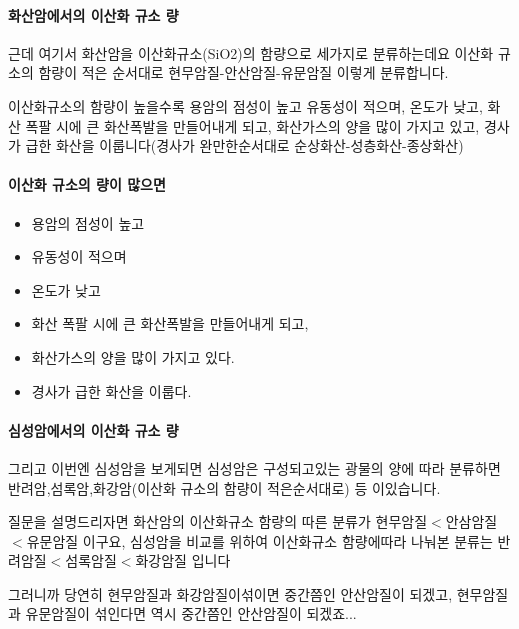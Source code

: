 \documentclass[12pt, a4paper, twoside]{book}
\begin{document}
		\paragraph{화산암에서의 이산화 규소 량}
		근데 여기서 화산암을 이산화규소(SiO2)의 함량으로 세가지로 분류하는데요
		이산화 규소의 함량이 적은 순서대로 현무암질-안산암질-유문암질 이렇게 분류합니다. 

		이산화규소의 함량이 높을수록 용암의 점성이 높고 유동성이 적으며, 온도가 낮고, 화산 폭팔 시에 큰 화산폭발을 만들어내게 되고, 
		화산가스의 양을 많이 가지고 있고, 경사가 급한 화산을 이룹니다(경사가 완만한순서대로 순상화산-성층화산-종상화산)

		
		\paragraph{이산화 규소의 량이 많으면}

			\begin{itemize}[	topsep=0.0em, itemsep=-0.5em, leftmargin=4em, labelsep=3em ] 
			\item	용암의 점성이 높고
			\item	유동성이 적으며
			\item	온도가 낮고
			\item	화산 폭팔 시에 큰 화산폭발을 만들어내게 되고, 
			\item	화산가스의 양을 많이 가지고 있다.
			\item	경사가 급한 화산을 이룹다.
			\end{itemize}	
		

		\paragraph{심성암에서의 이산화 규소 량}
		그리고 이번엔 심성암을 보게되면 심성암은 구성되고있는 광물의 양에 따라 분류하면
		반려암,섬록암,화강암(이산화 규소의 함량이 적은순서대로) 등 이있습니다.

		질문을 설명드리자면 화산암의 이산화규소 함량의 따른 분류가 현무암질$<$안삼암질$<$유문암질 이구요,
		심성암을 비교를 위하여 이산화규소 함량에따라 나눠본 분류는 반려암질$<$섬록암질$<$화강암질 입니다

		그러니까 당연히 현무암질과 화강암질이섞이면 중간쯤인 안산암질이 되겠고,
		현무암질과 유문암질이 섞인다면 역시 중간쯤인 안산암질이 되겠죠...
\end{document}
